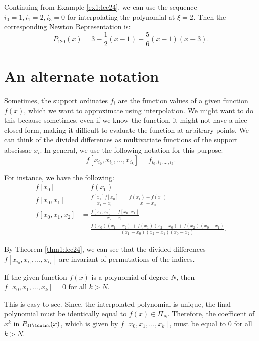 \begin{example}
    Continuing from Example \ref{ex1:lec24}, we can use the sequence $ i_0=1, i_1=2, i_3 = 0$ for interpolating the polynomial at $\xi = 2$. Then the corresponding Newton Representation is:
    \[
        P_{120}(x) = 3 - \frac{1}{2}(x-1) - \frac{5}{6} (x-1)(x-3)
    .\] 

\end{example}

\section{An alternate notation}

Sometimes, the support ordinates $f_i$ are the function values of a given function  $f(x)$, which we want to approximate using interpolation. We might want to do this because sometimes, even if we know the function, it might not have a nice closed form, making it difficult to evaluate the function at arbitrary points. We can think of the divided differences as multivariate functions of the support abscissae  $x_i$. In general, we use the following notation for this purpose:
\[
    f[x_{i_0},x_{i_1},\ldots, x_{i_k}] = f_{i_0,i_1,\ldots,i_k}
.\] 

For instance, we have the following:
\begin{align*}
    f[x_0] &= f(x_0)\\
    f[x_0,x_1] &= \frac{f[x_1]f[x_0]}{x_1-x_0} = \frac{f(x_1) - f(x_0)}{x_1-x_0} \\
    f[x_0,x_1,x_2] &= \frac{f[x_1,x_2] - f[x_0,x_1]}{x_2-x_0}\\
                   &= \frac{f(x_0)(x_1-x_2) + f(x_1)(x_2-x_0) + f(x_2)(x_0-x_1)}{(x_1-x_0)(x_2-x_1)(x_0-x_2)} 
.\end{align*}

By Theorem \ref{thm1:lec24}, we can see that the divided differences $f[x_{i_0},x_{i_1},\ldots,x_{i_k}]$ are invariant of permutations of the indices. 

\begin{thm}
    If the given function $f(x)$ is a polynomial of degree  $N$, then  $f[x_0,x_1,\ldots,x_k]=0$
    for all $k>N$.
\end{thm}

This is easy to see. Since, the interpolated polynomial is unique, the final polynomial must be identically equal to $f(x) \in \Pi _N$. Therefore, the coefficent of  $x^{k}$ in $P_{01\ldotsk}(x)$, which is given by $f[x_0,x_1,\ldots,x_k]$, must be equal to $0$ for all  $k>N$.


